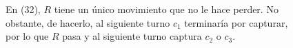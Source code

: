 \begin{figure}[!htbp]
\begin{tcbitemize}
{
                    }
    \end{tcbitemize}
    \captionsetup{font=footnotesize}
    \caption{En (32), $R$ tiene un \'unico movimiento que no le hace perder. No
    obstante, de hacerlo, al siguiente turno $c_1$ terminar\'ia por capturar,
    por lo que $R$ pasa y al siguiente turno captura $c_2$ o $c_3$.}
\end{figure}
